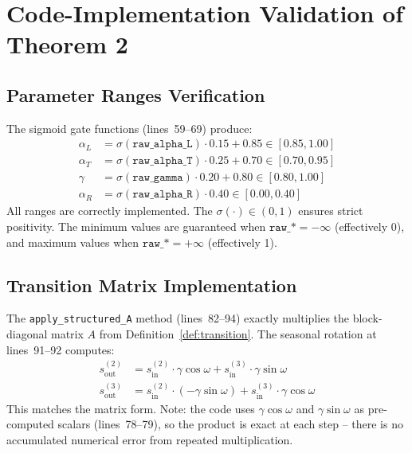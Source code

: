 \documentclass[11pt]{article}
\begin{document}
\section{Code-Implementation Validation of Theorem 2}

\subsection*{Parameter Ranges Verification}

The sigmoid gate functions (lines~59--69) produce:
\begin{align*}
\alpha_L &= \sigma(\texttt{raw\_alpha\_L}) \cdot 0.15 + 0.85 \in [0.85, 1.00] \\
\alpha_T &= \sigma(\texttt{raw\_alpha\_T}) \cdot 0.25 + 0.70 \in [0.70, 0.95] \\
\gamma   &= \sigma(\texttt{raw\_gamma})   \cdot 0.20 + 0.80 \in [0.80, 1.00] \\
\alpha_R &= \sigma(\texttt{raw\_alpha\_R}) \cdot 0.40 \in [0.00, 0.40]
\end{align*}
All ranges are correctly implemented. The $\sigma(\cdot) \in (0,1)$ ensures strict positivity. The minimum values are guaranteed when $\texttt{raw\_*} = -\infty$ (effectively 0), and maximum values when $\texttt{raw\_*} = +\infty$ (effectively 1).

\subsection*{Transition Matrix Implementation}

The \texttt{apply\_structured\_A} method (lines~82--94) exactly multiplies the block-diagonal matrix $A$ from Definition~\ref{def:transition}. The seasonal rotation at lines~91--92 computes:
\begin{align*}
s_{\text{out}}^{(2)} &= s_{\text{in}}^{(2)} \cdot \gamma\cos\omega + s_{\text{in}}^{(3)} \cdot \gamma\sin\omega \\
s_{\text{out}}^{(3)} &= s_{\text{in}}^{(2)} \cdot (-\gamma\sin\omega) + s_{\text{in}}^{(3)} \cdot \gamma\cos\omega
\end{align*}
This matches the matrix form. Note: the code uses $\gamma\cos\omega$ and $\gamma\sin\omega$ as pre-computed scalars (lines~78--79), so the product is exact at each step -- there is no accumulated numerical error from repeated multiplication.
\end{document}

